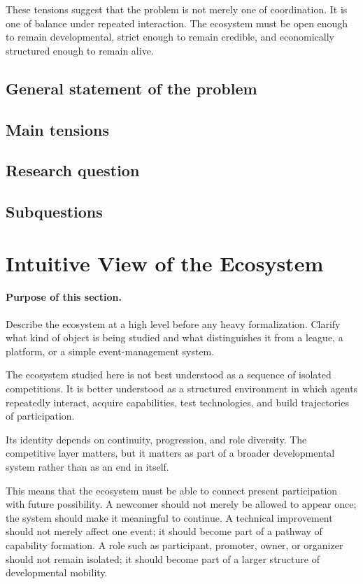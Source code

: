 \documentclass[11pt]{article}
\begin{document}
These tensions suggest that the problem is not merely one of coordination. It is one of balance under repeated interaction. The ecosystem must be open enough to remain developmental, strict enough to remain credible, and economically structured enough to remain alive.

\subsection{General statement of the problem}

\subsection{Main tensions}

\subsection{Research question}

\subsection{Subquestions}

\section{Intuitive View of the Ecosystem}

\paragraph{Purpose of this section.}
Describe the ecosystem at a high level before any heavy formalization. Clarify what kind of object is being studied and what distinguishes it from a league, a platform, or a simple event-management system.

The ecosystem studied here is not best understood as a sequence of isolated competitions. It is better understood as a structured environment in which agents repeatedly interact, acquire capabilities, test technologies, and build trajectories of participation.

Its identity depends on continuity, progression, and role diversity. The competitive layer matters, but it matters as part of a broader developmental system rather than as an end in itself.

This means that the ecosystem must be able to connect present participation with future possibility. A newcomer should not merely be allowed to appear once; the system should make it meaningful to continue. A technical improvement should not merely affect one event; it should become part of a pathway of capability formation. A role such as participant, promoter, owner, or organizer should not remain isolated; it should become part of a larger structure of developmental mobility.
\end{document}
